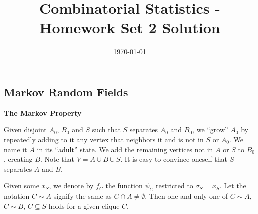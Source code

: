 \documentclass[11pt]{article} \usepackage{amssymb}
\begin{document}
\title{Combinatorial Statistics - Homework Set 2 Solution}

\date{\today}
\maketitle
\subsection{Markov Random Fields}
{\bf The Markov Property}

Given disjoint $A_0$, $B_0$ and $S$ such that $S$ separates $A_0$ and $B_0$,
we ``grow'' $A_0$ by repeatedly adding to it any vertex that neighbors it
and is not in $S$ or $A_0$. We name it $A$ in its ``adult'' state. We add the
remaining vertices not in $A$ or $S$ to $B_0$, creating $B$. Note that 
$V=A\cup B\cup S$. 
It is easy to convince oneself that $S$ separates $A$ and $B$.

Given some $x_S$, we denote by $f_C$ the function $\psi_C$ restricted
to $\sigma_S=x_S$. Let the notation $C\sim A$ 
signify the same as $C\cap A\neq\emptyset$. Then one and only one of $C\sim A$, $C\sim B$,
$C\subseteq S$  holds for a given clique $C$.
\end{document}
